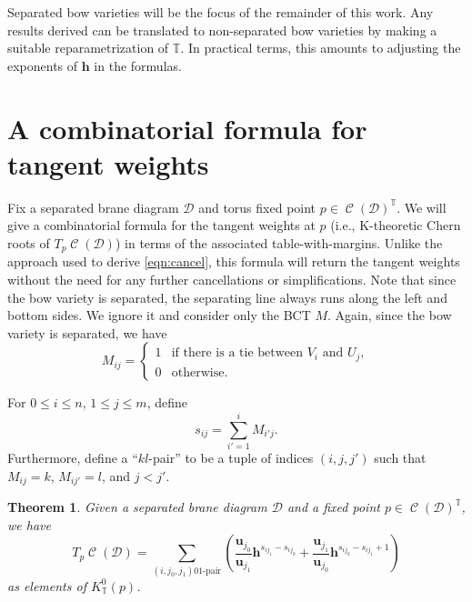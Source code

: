 \documentclass[pdftex]{sigma}
\numberwithin{equation}{section}
\newtheorem{Theorem}{Theorem}[section]
\newcommand{\brane}{\mathcal D}
\newcommand{\torus}{\mathbb T}
\newcommand{\hb}{\mathbf h}
\newcommand{\ub}{\mathbf u}
\DeclareMathOperator{\bowvar}{\mathcal C}
\begin{document}
Separated bow varieties will be the focus of the remainder of this work. Any results derived can be translated to non-separated bow varieties by making a suitable reparametrization of $\torus$. In practical terms, this amounts to adjusting the exponents of $\hb$ in the formulas.


\section{A combinatorial formula for tangent weights} \label{sec:bct_weights}
Fix a separated brane diagram $\brane$ and torus fixed point $p\in\bowvar(\brane)^\torus$. We will give a combinatorial formula for the tangent weights at $p$ (i.e., K-theoretic Chern roots of $T_p\bowvar(\brane)$) in terms of the associated table-with-margins. Unlike the approach used to derive \eqref{eqn:cancel}, this formula will return the tangent weights without the need for any further cancellations or simplifications. Note that since the bow variety is separated, the separating line always runs along the left and bottom sides. We ignore it and consider only the BCT $M$. Again, since the bow variety is separated, we have
\[
M_{ij} = \begin{cases}
1 & \text{if there is a tie between }V_i\text{ and }U_j, \\
0 & \text{otherwise}. \end{cases}
\]

\begin{Definition} \label{def:pairs}
For $0\leq i \leq n$, $1 \leq j \leq m$, define
\[
s_{ij} = \sum_{i' = 1}^i M_{i' j}.
\]
Furthermore, define a ``$kl$-pair'' to be a tuple of indices $(i, j, j')$ such that $M_{i j} = k$, $M_{i j'} = l$, and $j < j'$.
\end{Definition}

\begin{Theorem} \label{thm:weights}
Given a separated brane diagram $\brane$ and a fixed point $p\in\bowvar(\brane)^\torus$, we have
\begin{equation*}
T_p\bowvar(\brane) = \sum_{(i, j_0, j_1)\text{$01$-pair}} \left(
 \frac{\ub_{j_0}}{\ub_{j_1}}\hb^{s_{i j_1}-s_{i j_0}} + \frac{\ub_{j_1}}{\ub_{j_0}}\hb^{s_{i j_0}-s_{i j_1}+1} \right)
\end{equation*}
as elements of $K^0_\torus(p)$.
\end{Theorem}
\end{document}
